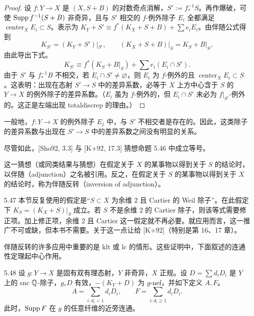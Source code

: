\begin{proof}
设 $f\colon Y\to X$ 是 $(X,S+B)$ 的对数奇点消解，$S':=f^{-1}_*S$。再作爆破，可使 $\operatorname{Supp} f^{-1}(S+B)$ 非奇异，且与 $S'$ 相交的 $f$-例外除子 $E_i$ 全都满足 $\operatorname{center}_XE_i\subset S$。表示为 $K_Y+S'\equiv f^*(K_X+S+B)+\sum e_iE_i$。由伴随公式得到
\[
K_{S'}=(K_Y+S')|_{S'},\qquad (K_X+S+B)|_S=K_S+B|_S,
\]
由此导出下式。
\[
K_{S'}\equiv f^*(K_S+B|_S)+\textstyle\sum e_i(E_i\cap S').
\]
由于 $S'$ 与 $f^{-1}_*B$ 不相交，若 $E_i\cap S'\ne\varnothing$，则 $E_i$ 为 $f$-例外的且 $\operatorname{center}_XE_i\subset S$。这表明：出现在态射 $S'\to S$ 中的差异系数，必等于 $X$ 上方中心含于 $S$ 的 $Y\to X$ 的例外除子的差异系数。（$E_i$ 虽为 $f$-例外的，但 $E_i\cap S'$ 未必为 $f|_{S'}$-例外的。这正是左端出现 totaldiscrep 的理由。）
\end{proof}

一般地，$f\colon Y\to X$ 的例外除子 $E_j$ 中，与 $S'$ 不相交者是存在的。因此，这类除子的差异系数与出现在 $S'\to S$ 中的差异系数之间没有明显的关系。

尽管如此，[Sho92, 3.3] 与 [K+92, 17.3] 猜想命题 5.46 中成立等号。

这一猜想（或同类结果与猜想）在假定关于 $X$ 的某事物以得到关于 $S$ 的结论时，以伴随（adjunction）之名被引用。反之，在假定关于 $S$ 的某事物以得到关于 $X$ 的结论时，称为伴随反转（inversion of adjunction）。

\begin{remark}{5.47}
本节反复使用的假定是“$S\subset X$ 为余维 $2$ 且 Cartier
的 Weil 除子”。在此假定下 $K_S=(K_X+S)|_S$ 成立。若 $S$ 不是余维 $2$ 的 Cartier 除子，则该等式需要修正项。加上修正项，余维 $2$ 且 Cartier 这一假定就不再必要。就应用而言，这一推广不可或缺，但本书不需要。关于这一点让给 [K+92]（特别是第 16、17 章）。
\end{remark}


伴随反转的许多应用中重要的是 klt 或 lc 的情形。这些证明中，下面叙述的连通性定理起中心作用。

\begin{theoremp}[{连通性定理 [K+92, 17.4]}]{5.48}
设 $g\colon Y\to X$ 是固有双有理态射，$Y$ 非奇异，$X$ 正规。设 $D=\sum d_iD_i$ 是 $Y$ 上的 snc $\mathbb{Q}$-除子，$g_*D$ 有效，$-(K_Y+D)$ 为 $g$-nef，并如下定义 $A,F$。
\[
A=\sum_{i:d_i<1}d_iD_i,\qquad F=\sum_{i:d_i\ge1}d_iD_i.
\]
此时，$\operatorname{Supp} F$ 在 $g$ 的任意纤维的近旁连通。
\end{theoremp}

